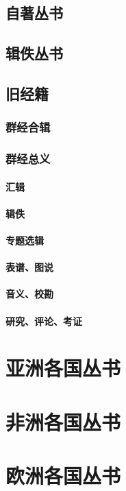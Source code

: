 \documentclass[UTF8]{../ApplicationUniverse}
\begin{document}
    \subsection{自著丛书}
    \subsection{辑佚丛书}
    \subsection{旧经籍}
        \subsubsection{群经合辑}
        \subsubsection{群经总义}
            \paragraph{汇辑}
            \paragraph{辑佚}
            \paragraph{专题选辑}
            \paragraph{表谱、图说}
            \paragraph{音义、校勘}
            \paragraph{研究、评论、考证}
\section{亚洲各国丛书}
\section{非洲各国丛书}
\section{欧洲各国丛书}
\end{document}
